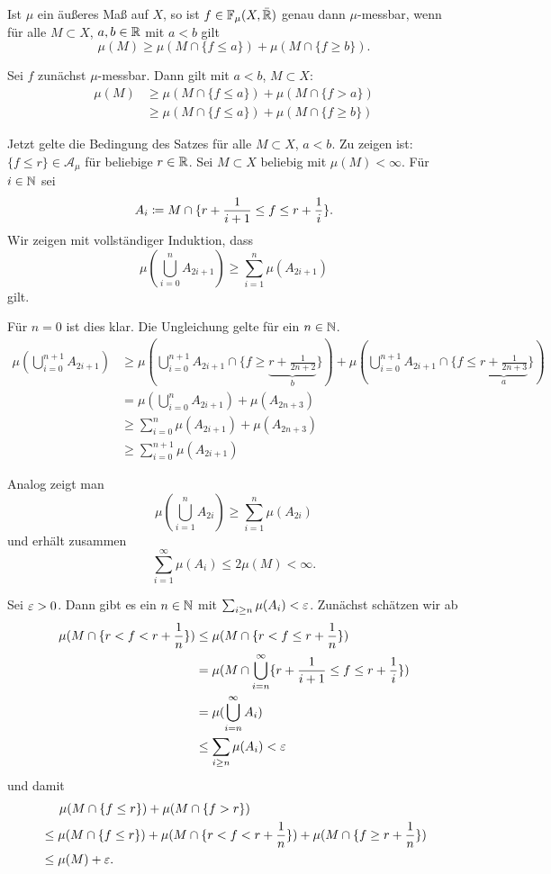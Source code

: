 \documentclass[a4paper,twoside,DIV15,BCOR12mm]{scrbook}
\newcommand{\A}{\mathcal A}
\begin{document}
\begin{satz}
\label{satz:1.8}
Ist $\mu$ ein äußeres Maß auf $X$, so ist $f\in \mathbb F_\mu(X,\bar{\mathbb{R}})$ genau dann $\mu$-messbar, wenn für alle $M\subset X$, $a,b\in\mathbb{R}$ mit $a<b$ gilt
\[
\mu(M) \ge \mu(M\cap \{f \le a\}) + \mu(M\cap \{f\ge b\}).
\]
\end{satz}

\begin{beweis}
Sei $f$ zunächst $\mu$-messbar. Dann gilt mit $a<b$, $M\subset X$: 
\begin{align*}
\mu(M) &\ge \mu(M\cap\{f\le a\} ) + \mu(M\cap \{f> a\}) \\
&\ge \mu(M\cap\{f\le a\} ) + \mu(M\cap \{f\ge b\}) 
\end{align*}

Jetzt gelte die Bedingung des Satzes für alle $M\subset X$, $a<b$. Zu zeigen ist: $\{f\le r\}\in \A_\mu$ für beliebige $r\in\mathbb{R}$. Sei $M\subset X$ beliebig mit $\mu(M) <\infty$. Für $i\in \mathbb{N}$ sei
\[
A_i \da M\cap \{r + \frac1{i+1} \le f \le r+\frac 1i\}.
\]
Wir zeigen mit vollständiger Induktion, dass 
\[
\mu(\bigcup_{i=0}^n A_{2i+1})  \ge \sum_{i=1}^n \mu(A_{2i+1})
\]
gilt.

Für $n=0$ ist dies klar. Die Ungleichung gelte für ein $n\in\mathbb{N}$.
\begin{align*}
\mu(\bigcup_{i=0}^{n+1} A_{2i+1}) 
&\ge \mu(\bigcup_{i=0}^{n+1} A_{2i+1} \cap \{f\ge \underbrace{r+ \frac1{2n+2}}_{b}\}) + 
     \mu(\bigcup_{i=0}^{n+1} A_{2i+1} \cap \{f\le \underbrace{r+\frac1{2n+3}}_{a}\}) \\
&= \mu(\bigcup_{i=0}^n A_{2i+1}) + \mu(A_{2n+3}) \\
&\ge \sum_{i=0}^n \mu(A_{2i+1}) + \mu(A_{2n+3}) \\
&\ge \sum_{i=0}^{n+1} \mu(A_{2i+1})
\end{align*}

Analog zeigt man 
\[
\mu(\bigcup_{i=1}^n A_{2i})  \ge \sum_{i=1}^n \mu(A_{2i})
\]
und erhält zusammen
\[
\sum_{i=1}^\infty \mu(A_i) \le 2 \mu(M) <\infty.
\]

Sei $\varepsilon>0$. Dann gibt es ein $n\in\mathbb{N}$ mit $\sum_{i\ge n}\mu(A_i) <\varepsilon$. Zunächst schätzen wir ab
\begin{align*}
\mu(M\cap \{r < f < r+\frac1n\}) 
&\le \mu(M\cap \{r<f\le r + \frac1n\}) \\
&= \mu(M\cap \bigcup_{i=n}^\infty \{r +\frac 1{i+1} \le f \le r+\frac 1i\}) \\
&= \mu(\bigcup_{i=n}^\infty A_i) \\
&\le \sum_{i\ge n} \mu(A_i) < \varepsilon
\end{align*}
und damit
\begin{align*}
&\phantom{=\ \ }\mu(M\cap \{f\le r\}) + \mu(M\cap \{f>r\})  \\
&\le \mu(M\cap \{f\le r\}) + \mu(M\cap \{r<f<r+\frac1n\}) + \mu(M\cap \{f\ge r+\frac 1n\}) \\
&\le \mu(M) + \varepsilon.
\end{align*}
\end{beweis}
\end{document}

